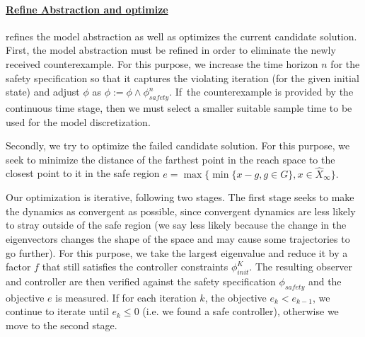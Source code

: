 \documentclass[sigconf]{llncs}
\renewcommand{\vec}[1]{{#1}}
\renewcommand{\note}[1]{\textcolor{red}{[#1]}}
\begin{document}
\paragraph{\underline{{\sc Refine Abstraction and optimize}}} refines the
model abstraction as well as optimizes the current candidate
solution.
%
First, the model abstraction must be refined in order to eliminate
the newly received counterexample. For this purpose,
we increase the time horizon $n$ for the
safety specification so that it captures the violating iteration
(for the given initial state) and adjust $\phi$ as 
$\phi := \phi \wedge \phi_\mathit{safety}^n$.
If~the counterexample is provided by the {\sc continuous time} stage,
then we must select a smaller suitable sample time to be used
for the model discretization.


Secondly, we try to optimize the failed candidate solution.
For this purpose, we seek to minimize the distance of the farthest point in the
reach space to the closest point to it in the safe region
$%
e = \max\{\min\{\vec{x}-\vec{g}, \vec{g}\in G\}, \vec{x} \in \hat{X}_\infty \}.
$%

Our optimization is iterative, following two stages.  The first stage
seeks to make the dynamics as convergent as possible, since convergent
dynamics are less likely to stray outside of the safe region (we say
less likely because the change in the eigenvectors changes the shape
of the space and may cause some trajectories to go further). For this
purpose, we take the largest eigenvalue and reduce it by a factor $f$
that still satisfies the controller constraints $\phi_\mathit{init}^{K}$.
The resulting observer and controller are then
verified against the safety specification $\phi_\mathit{safety}$ and the
objective $e$ is measured. %
If for each iteration $k$, the objective $e_k<e_{k-1}$, we continue to
iterate until $e_k \leq 0$ (i.e. we found a safe controller),
otherwise we move to the second stage.
\end{document}

